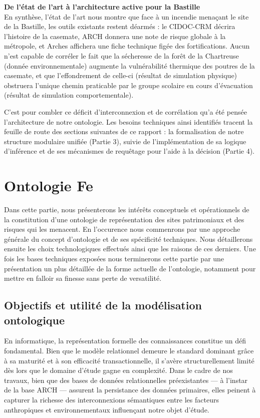 \documentclass{article}
\begin{document}
\begin{filrouge}
\textbf{De l'état de l'art à l'architecture active pour la Bastille} \\
En synthèse, l'état de l'art nous montre que face à un incendie menaçant le site de la Bastille, les outils existants restent déarmés : le CIDOC-CRM décrira l'histoire de la casemate, ARCH donnera une note de risque globale à la métropole, et Arches affichera une fiche technique figée des fortifications. Aucun n'est capable de corréler le fait que la sécheresse de la forêt de la Chartreuse (donnée environnementale) augmente la vulnérabilité thermique des poutres de la casemate, et que l'effondrement de celle-ci (résultat de simulation physique) obstruera l'unique chemin praticable par le groupe scolaire en cours d'évacuation (résultat de simulation comportementale).

C'est pour combler ce déficit d'interconnexion et de corrélation qu'a été pensée l'architecture de notre ontologie. Les besoins techniques ainsi identifiés tracent la feuille de route des sections suivantes de ce rapport : la formalisation de notre structure modulaire unifiée (Partie 3), suivie de l'implémentation de sa logique d'inférence et de ses mécanismes de requêtage pour l'aide à la décision (Partie 4).
\end{filrouge}
\clearpage

\section{Ontologie Fe}
Dans cette partie, nous présenterons les intérêts conceptuels et opérationnels de la constitution d'une ontologie de représentation des sites patrimoniaux et des risques qui les menacent. En l'occurence nous commenrons par une approche générale du concept d'ontologie et de ses spécificité techniques. Nous détaillerons ensuite les choix technologiques effectués ainsi que les raisons de ces derniers. Une fois les bases techniques exposées nous terminerons cette partie par une présentation un plus détaillée de la forme actuelle de l'ontologie, notamment pour mettre en falloir sa finesse sans perte de versatilité.

\subsection{Objectifs et utilité de la modélisation ontologique}

En informatique, la représentation formelle des connaissances constitue un défi fondamental. Bien que le modèle relationnel demeure le standard dominant grâce à sa maturité et à son efficacité transactionnelle, il s'avère structurellement limité dès lors que le domaine d'étude gagne en complexité. Dans le cadre de nos travaux, bien que des bases de données relationnelles préexistantes — à l'instar de la base ARCH — assurent la persistance des données primaires, elles peinent à capturer la richesse des interconnexions sémantiques entre les facteurs anthropiques et environnementaux influençant notre objet d'étude.
\end{document}
